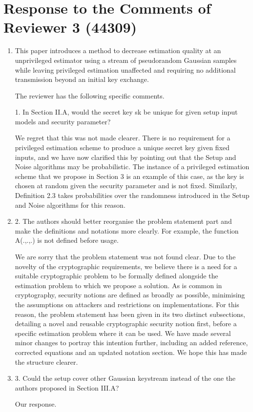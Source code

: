 \documentclass[a4paper]{scrartcl}
\newenvironment{rebuttal}{\begin{enumerate}[label={\color{grey}\thesection.\arabic{enumi}},leftmargin=0pt,ref=\thesection.\arabic{enumi}]}{\end{enumerate}}
\newcommand{\reviewtext}[1]{{\color{nblue} #1}}
\begin{document}



\section*{Response to the Comments of Reviewer 3 (44309)}
\def\thesection{R3}
\begin{rebuttal}
\item \reviewtext{This paper introduces a method to decrease estimation quality at an unprivileged estimator using a stream of pseudorandom Gaussian samples while leaving privileged estimation unaffected and requiring no additional transmission beyond an initial key exchange.

The reviewer has the following specific comments.

1. In Section II.A, would the secret key sk be unique for given setup input models and security parameter?}

We regret that this was not made clearer. There is no requirement for a privileged estimation scheme to produce a unique secret key given fixed inputs, and we have now clarified this by pointing out that the Setup and Noise algorithms may be probabilistic. The instance of a privileged estimation scheme that we propose in Section 3 is an example of this case, as the key is chosen at random given the security parameter and is not fixed. Similarly, Definition 2.3 takes probabilities over the randomness introduced in the Setup and Noise algorithms for this reason.

\item \reviewtext{2. The authors should better reorganise the problem statement part and make the definitions and notations more clearly. For example, the function A(.,.,.) is not defined before usage.}

We are sorry that the problem statement was not found clear. Due to the novelty of the cryptographic requirements, we believe there is a need for a suitable cryptographic problem to be formally defined alongside the estimation problem to which we propose a solution. As is common in cryptography, security notions are defined as broadly as possible, minimising the assumptions on attackers and restrictions on implementations. For this reason, the problem statement has been given in its two distinct subsections, detailing a novel and reusable cryptographic security notion first, before a specific estimation problem where it can be used. We have made several minor changes to portray this intention further, including an added reference, corrected equations and an updated notation section. We hope this has made the structure clearer.

\item \reviewtext{3. Could the setup cover other Gaussian keystream instead of the one the authors proposed in Section III.A?}

Our response.

\end{rebuttal}


\end{document}
